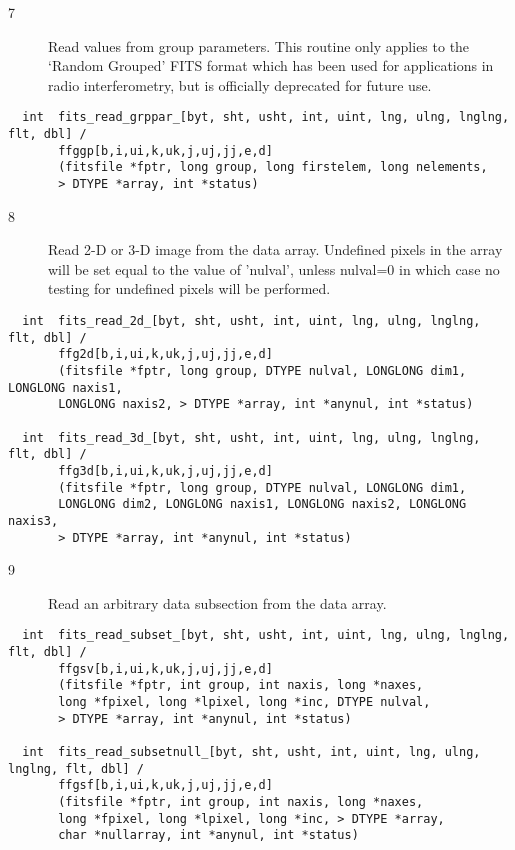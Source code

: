 \documentclass[11pt]{book}
\begin{document}
\begin{description}
\item[7 ] Read values from group parameters.  This routine only applies
    to the `Random Grouped' FITS format which has been used for
    applications in radio interferometry, but is officially deprecated
   for future use. \label{ffggpx}
\end{description}

\begin{verbatim}
  int  fits_read_grppar_[byt, sht, usht, int, uint, lng, ulng, lnglng, flt, dbl] /
       ffggp[b,i,ui,k,uk,j,uj,jj,e,d]
       (fitsfile *fptr, long group, long firstelem, long nelements,
       > DTYPE *array, int *status)
\end{verbatim}

\begin{description}
\item[8 ]  Read 2-D or 3-D image from the data array.  Undefined
     pixels in the array will be set equal to the value of 'nulval',
     unless nulval=0 in which case no testing for undefined pixels will
    be performed. \label{ffg2dx} \label{ffg3dx}
\end{description}

\begin{verbatim}
  int  fits_read_2d_[byt, sht, usht, int, uint, lng, ulng, lnglng, flt, dbl] /
       ffg2d[b,i,ui,k,uk,j,uj,jj,e,d]
       (fitsfile *fptr, long group, DTYPE nulval, LONGLONG dim1, LONGLONG naxis1,
       LONGLONG naxis2, > DTYPE *array, int *anynul, int *status)

  int  fits_read_3d_[byt, sht, usht, int, uint, lng, ulng, lnglng, flt, dbl] /
       ffg3d[b,i,ui,k,uk,j,uj,jj,e,d]
       (fitsfile *fptr, long group, DTYPE nulval, LONGLONG dim1,
       LONGLONG dim2, LONGLONG naxis1, LONGLONG naxis2, LONGLONG naxis3,
       > DTYPE *array, int *anynul, int *status)
\end{verbatim}

\begin{description}
\item[9 ]   Read an arbitrary data subsection from the data array.
      \label{ffgsvx} \label{ffgsfx}
\end{description}

\begin{verbatim}
  int  fits_read_subset_[byt, sht, usht, int, uint, lng, ulng, lnglng, flt, dbl] /
       ffgsv[b,i,ui,k,uk,j,uj,jj,e,d]
       (fitsfile *fptr, int group, int naxis, long *naxes,
       long *fpixel, long *lpixel, long *inc, DTYPE nulval,
       > DTYPE *array, int *anynul, int *status)

  int  fits_read_subsetnull_[byt, sht, usht, int, uint, lng, ulng, lnglng, flt, dbl] /
       ffgsf[b,i,ui,k,uk,j,uj,jj,e,d]
       (fitsfile *fptr, int group, int naxis, long *naxes,
       long *fpixel, long *lpixel, long *inc, > DTYPE *array,
       char *nullarray, int *anynul, int *status)
\end{verbatim}

\end{document}
